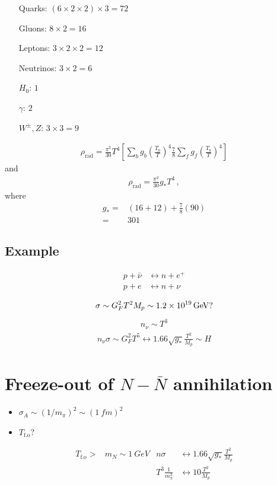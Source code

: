 \documentclass[12pt,letterpaper]{article}
\begin{document}
\begin{itemize}
\item[Quarks:] $(6\times 2\times2)\times 3=72$
\item[Gluons:] $8\times 2=16$
\item[Leptons:] $3\times 2\times2=12$
\item[Neutrinos:] $3\times 2=6$
\item[$H_0$:] $1$
\item[$\gamma$:] $2$
\item[$W^{\pm},Z$:] $3\times3=9$
\end{itemize}

\begin{align}
  \rho_{\text{rad}}=\frac{\pi^2}{30}T^4
  \left[
\sum_b g_b
\left(
\frac{T_b}{T}
\right)^4
\frac{7}{8}\sum_f g_f
\left(
\frac{T_b}{T}
\right)^4
  \right]
\end{align}
and
\begin{align}
   \rho_{\text{rad}}=\frac{\pi^2}{30}g_* T^4\,,
\end{align}
where
\begin{align}
  g_*=&(16+12)+\frac{7}{8}(90)\nonumber\\
 =&301
\end{align}

\subsection*{Example}
\begin{align}
  p+\bar{\nu}&\longleftrightarrow n+e^+\nonumber\\
  p+e&\longleftrightarrow n+\nu\nonumber\\
\end{align}
\begin{align}
  \sigma\sim G_F^2 T^2 M_p \sim\SI{1.2E19}{GeV}?
\end{align}
\begin{align}
  n_\nu\sim  T^3
\end{align}
\begin{align}
  n_\nu\sigma\sim G_F^2 T^5\longleftrightarrow 1.66\sqrt{g_*}
\frac{T^2}{M_p}\sim H
\end{align}

\section{Freeze-out of $N-\bar{N}$ annihilation}
\begin{itemize}
\item $\sigma_A\sim (1/m_{\pi})^2\sim (\SI{1}{fm})^2$
\item $T_{\text{f.o}}?$
\end{itemize}
\begin{align}
  T_{\text{f.o}}>&m_N\sim \SI{1}{GeV} & n\sigma &\longleftrightarrow 1.66\sqrt{g_{*}}\frac{T^2}{M_p}\nonumber\\
&&  T^3 \frac{1}{m_{\pi}^2}& \longleftrightarrow 10 \frac{T^2}{M_p}
\end{align}
\end{document}

